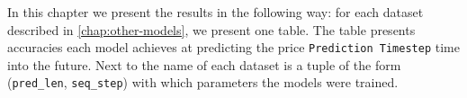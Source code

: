 In this chapter we present the results in the following way: for each dataset described in \autoref{chap:other-models}, we present one table. The table presents accuracies each model achieves at predicting the price \verb|Prediction Timestep| time into the future. Next to the name of each dataset is a tuple of the form (\verb|pred_len|, \verb|seq_step|) with which parameters the models were trained.






